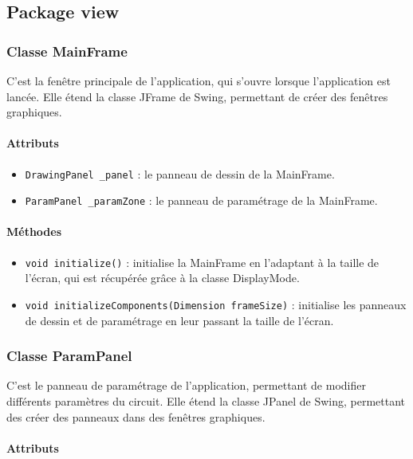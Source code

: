 \documentclass{report}
\begin{document}
\newpage
\subsection{Package view}

\subsubsection{Classe MainFrame}

C'est la fenêtre principale de l'application, qui s'ouvre lorsque l'application est lancée. Elle étend la classe JFrame de Swing, permettant de créer des fenêtres graphiques.

\paragraph*{Attributs}

\begin{itemize}
\item \texttt{DrawingPanel \_panel} : le panneau de dessin de la MainFrame.
\item \texttt{ParamPanel \_paramZone} : le panneau de paramétrage de la MainFrame.
\end{itemize}

\paragraph*{Méthodes}

\begin{itemize}
\item \texttt{void initialize()} : initialise la MainFrame en l'adaptant à la taille de l'écran, qui est récupérée grâce à la classe DisplayMode.
\item \texttt{void initializeComponents(Dimension frameSize)} : initialise les panneaux de dessin et de paramétrage en leur passant la taille de l'écran.
\end{itemize}


\subsubsection{Classe ParamPanel}

C'est le panneau de paramétrage de l'application, permettant de modifier différents paramètres du circuit. Elle étend la classe JPanel de Swing, permettant des créer des panneaux dans des fenêtres graphiques.

\paragraph*{Attributs}
\end{document}
